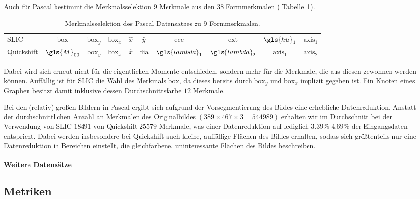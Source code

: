 Auch für \gls{Pascal} bestimmt die Merkmalsselektion $9$ Merkmale aus den $38$ Formmerkmalen (\vgl{} Tabelle~\ref{tab:pascal_voc_merkmale}).
\begin{table}[t]
\centering
\begin{tabular}{lccccccccc}
  \toprule
  \gls{SLIC} & $\mathrm{box}$ & $\mathrm{box}_y$ & $\mathrm{box}_x$ & $\hat x$ & $\hat y$ & $\mathrm{ecc}$ & $\mathrm{ext}$ & $\gls{hu}_1$ & $\mathrm{axis}_1$\\
  Quickshift & $\gls{M}_{00}$ & $\mathrm{box}_y$ & $\mathrm{box}_x$ & $\hat x$ & $\mathrm{dia}$ & $\gls{lambda}_1$ & $\gls{lambda}_2$ & $\mathrm{axis}_1$ & $\mathrm{axis}_2$\\
  \bottomrule
\end{tabular}
  \caption[\gls{Pascal} Merkmalsselektion]{Merkmalsselektion des \gls{Pascal} Datensatzes zu $9$ Formmerkmalen.}
\label{tab:pascal_voc_merkmale}
\end{table}
Dabei wird sich erneut nicht für die eigentlichen Momente entschieden, sondern mehr für die Merkmale, die aus diesen gewonnen werden können.
Auffällig ist für \gls{SLIC} die Wahl des Merkmals $\mathrm{box}$, da dieses bereits durch $\mathrm{box}_y$ und $\mathrm{box}_x$ implizit gegeben ist.
Ein Knoten eines Graphen besitzt damit inklusive dessen Durchschnittsfarbe $12$ Merkmale.

Bei den (relativ) großen Bildern in \gls{Pascal} ergibt sich aufgrund der Vorsegmentierung des Bildes eine erhebliche Datenreduktion.
Anstatt der durchschnittlichen Anzahl an Merkmalen des Originalbildes $\left(389 \times 467 \times 3 = 544989\right)$ erhalten wir im Durchschnitt bei der Verwendung von \gls{SLIC} $18491$ \bzw{} von Quickshift $25579$ Merkmale, was einer Datenreduktion auf lediglich $3.39\%$ \bzw{} $4.69\%$ der Eingangsdaten entspricht.
Dabei werden insbesondere bei Quickshift auch kleine, auffällige Flächen des Bildes erhalten, sodass sich größtenteils nur eine Datenreduktion in Bereichen einstellt, die gleichfarbene, uninteressante Flächen des Bildes beschreiben.

\paragraph{Weitere Datensätze}
\label{weitere_datensaetze}


\subsection{Metriken}
\label{metriken}

